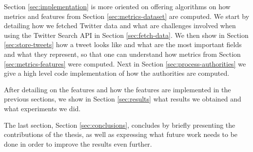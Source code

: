 Section \ref{sec:implementation} is more oriented on offering algorithms on how metrics and features from Section \ref{sec:metrics-dataset} are computed. We start by detailing how we fetched Twitter data and what are challenges involved when using the Twitter Search API in Section \ref{sec:fetch-data}. We then show in Section \ref{sec:store-tweets} how a tweet looks like and what are the most important fields and what they represent, so that one can understand how metrics from Section \ref{sec:metrics-features} were computed. Next in Section \ref{sec:process-authorities} we give a high level code implementation of how the authorities are computed.

After detailing on the features and how the features are implemented in the previous sections, we show in Section \ref{sec:results} what results we obtained and what experiments we did.

The last section, Section \ref{sec:conclusions}, concludes by briefly presenting the contributions of the thesis, as well as expressing what future work needs to be done in order to improve the results even further.